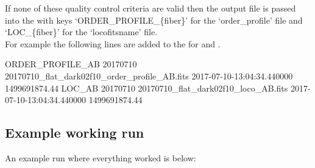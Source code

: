 \noindent If none of these quality control criteria are valid then the output file is passed into the \calibdb with keys `ORDER\_PROFILE\_\{fiber\}' for the `order\_profile' file and `LOC\_\{fiber\}' for the `locofitsname' file. \\

\noindent For example the following lines are added to the \calibdb for 
 and . \\

\begin{textbox}[title={In calibration database file}]
ORDER_PROFILE_AB 20170710 20170710_flat_dark02f10_order_profile_AB.fits 2017-07-10-13:04:34.440000 1499691874.44
LOC_AB 20170710 20170710_flat_dark02f10_loco_AB.fits 2017-07-10-13:04:34.440000 1499691874.44
\end{textbox}


\subsection{Example working run}

An example run where everything worked is below:

